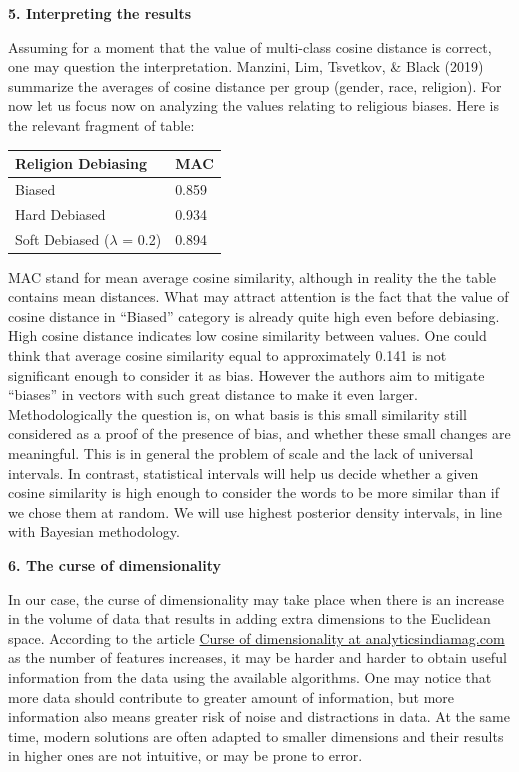 \documentclass[
  10pt,
  dvipsnames,enabledeprecatedfontcommands]{scrartcl}
\begin{document}
\textbf{5. Interpreting the results}

Assuming for a moment that the value of multi-class cosine distance is
correct, one may question the interpretation. Manzini, Lim, Tsvetkov, \&
Black (2019) summarize the averages of cosine distance per group
(gender, race, religion). For now let us focus now on analyzing the
values relating to religious biases. Here is the relevant fragment of
table:

\begin{longtable}[]{@{}ll@{}}
\toprule
Religion Debiasing & MAC \\
\midrule
\endhead
Biased & 0.859 \\
Hard Debiased & 0.934 \\
Soft Debiased (\(\lambda\) = 0.2) & 0.894 \\
\bottomrule
\end{longtable}

MAC stand for mean average cosine similarity, although in reality the
the table contains mean distances. What may attract attention is the
fact that the value of cosine distance in ``Biased'' category is already
quite high even before debiasing. High cosine distance indicates low
cosine similarity between values. One could think that average cosine
similarity equal to approximately 0.141 is not significant enough to
consider it as bias. However the authors aim to mitigate ``biases'' in
vectors with such great distance to make it even larger.
Methodologically the question is, on what basis is this small similarity
still considered as a proof of the presence of bias, and whether these
small changes are meaningful. This is in general the problem of scale
and the lack of universal intervals. In contrast, statistical intervals
will help us decide whether a given cosine similarity is high enough to
consider the words to be more similar than if we chose them at random.
We will use highest posterior density intervals, in line with Bayesian
methodology.

\textbf{6. The curse of dimensionality}

In our case, the curse of dimensionality may take place when there is an
increase in the volume of data that results in adding extra dimensions
to the Euclidean space. According to the article
\href{https://analyticsindiamag.com/curse-of-dimensionality-and-what-beginners-should-do-to-overcome-it/}{Curse
of dimensionality at analyticsindiamag.com} as the number of features
increases, it may be harder and harder to obtain useful information from
the data using the available algorithms. One may notice that more data
should contribute to greater amount of information, but more information
also means greater risk of noise and distractions in data. At the same
time, modern solutions are often adapted to smaller dimensions and their
results in higher ones are not intuitive, or may be prone to error.
\end{document}
